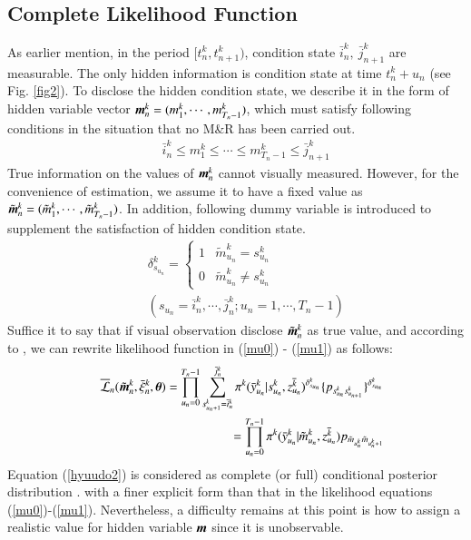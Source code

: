 \documentclass[a4paper,oneside,onecolumn,preprint,10pt,authoryear]{elsarticle}
\begin{document}
\subsection{Complete Likelihood Function}
\label{sec52}
As earlier mention, in the period $[t^k_n,t^k_{n+1})$, condition state $\bar{i}_n^k,~\bar{j}_{n+1}^k$ are measurable. The only hidden information is condition state at time $t^k_n+u_n$ (see Fig. \ref{fig2}). To disclose the hidden condition state, we describe it in the form of hidden variable vector $\mbox{\boldmath$m$}_n^k=(m_1^k,\cdots,m_{T_n-1}^k)$, which must satisfy following conditions in the situation that no M\&R has been carried out. 
\begin{eqnarray}
&& \bar{i}_n^k\leq m_1^k \leq \cdots \leq m_{T_{n}-1}^k \leq \bar{j}_{n+1}^{k} \label{stk0} 
\end{eqnarray}
True information on the values of $\mbox{\boldmath$m$}_n^k$ cannot visually measured. However, for the convenience of estimation, we assume it to have a fixed value as $\tilde{\mbox{\boldmath$m$}}_n^k=(\tilde{m}_1^k,\cdots,\tilde{m}_{T_n-1}^k)$. In addition, following dummy variable is introduced to supplement the satisfaction of hidden condition state.
\begin{eqnarray}
&& \delta_{s_{u_n}}^k=\left\{
\begin{array}{ll}
1 & \tilde{m}_{u_n}^k =s_{u_n}^k\\
0 & \tilde{m}_{u_n}^k \ne s_{u_n}^k
\end{array}
\right.\\
&& (s_{u_n}=\bar{i}_n^k,\cdots,\bar{j}_n^k;u_n=1,\cdots,T_n-1) \nonumber
\end{eqnarray}
Suffice it to say that if visual observation disclose $\tilde{\mbox{\boldmath$m$}}_n^k$ as true value, and according to \citet{demp}, we can rewrite likelihood function in (\ref{mu0}) - (\ref{mu1}) as follows:
\begin{eqnarray}
&& \overline{\cal L}_n(\tilde{\mbox{\boldmath$m$}}_n^k,\bar{\xi}_n^k,\mbox{\boldmath$\theta$})
 = \prod_{u_n=0}^{T_n-1} \sum_{s_{u_n+1}^k=\bar{i}_n^k}^{\bar{j}_n^k} 
\pi^k(\bar{y}_{u_n}^k|s_{u_n}^k,\bar{z^k_{u_n}})^{\delta_{s_{u_n}}^k} \{p_{s_{u_n}^ks^k_{u_{n+1}}}\}^{\delta^k_{s_{u_{n}}}} 
\nonumber \\
&&\hspace{20mm}  = \prod_{u_n=0}^{T_n-1} \pi^k(\bar{y}^k_{u_n}|\tilde{m}^k_{u_n},\bar{z^k_{u_n}}) p_{\tilde{m}_{u_n^k}\tilde{m}_{u^k_{n}+1}} 
 \label{hyuudo2}
\end{eqnarray}
Equation (\ref{hyuudo2}) is considered as complete (or full) conditional posterior distribution \citep{dani-hed}. with a finer explicit form than that in the likelihood equations (\ref{mu0})-(\ref{mu1}). Nevertheless, a difficulty remains at this point is how to assign a realistic value for hidden variable $\mbox{\boldmath$m$}$ since it is unobservable. 
\end{document}
